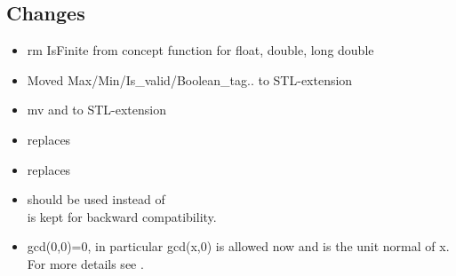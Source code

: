 \subsection{Changes}
\begin{itemize}
\item rm IsFinite from  concept
      function  for float, double, long double 
\item Moved Max/Min/Is\_valid/Boolean\_tag.. to STL-extension 
\item mv  and  
      to STL-extension
\item {} replaces 
\item {} replaces  
\item {} should be used instead of \\
       is kept for backward compatibility.
\item gcd(0,0)=0, in particular gcd(x,0) is allowed now and is the unit normal 
      of x. For more details see . \\
\end{itemize}


